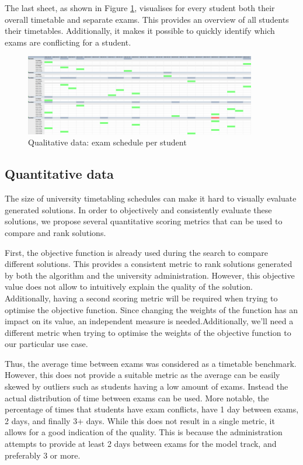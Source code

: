 The last sheet, as shown in Figure \ref{fig:sheet3}, visualises for every student both their overall timetable and separate exams. This provides an overview of all students their timetables. Additionally, it makes it possible to quickly identify which exams are conflicting for a student.

\begin{figure}[H]
	\centering
	\includegraphics[width=0.9\textwidth]{images/excel/excel_sheet3.png} 
	\caption{Qualitative data: exam schedule per student}
	\label{fig:sheet3}
\end{figure}

\subsection{Quantitative data} \label{quantitative}

The size of university timetabling schedules can make it hard to visually evaluate generated solutions. In order to objectively and consistently evaluate these solutions, we propose several quantitative scoring metrics that can be used to compare and rank solutions.

First, the objective function is already used during the search to compare different solutions. This provides a  consistent metric to rank  solutions generated by both the algorithm and the university administration. However, this objective value does not allow to intuitively explain the quality of the solution. Additionally, having a second scoring metric will be required when trying to optimise the objective function. Since changing the weights of the function has an impact on its value, an independent measure is needed.Additionally, we'll need a different metric when trying to optimise the weights of the objective function to our particular use case. 

Thus, the average time between exams was considered as a timetable benchmark. However, this does not provide a suitable metric as the average can be easily skewed by outliers such as students having a low amount of exams. Instead the actual distribution of time between exams can be used. More notable, the percentage of times that students have exam conflicts, have 1 day between exams, 2 days, and finally 3+ days. While this does not result in a single metric, it allows for a good indication of the quality. This is because the administration attempts to provide at least 2 days between exams for the model track, and preferably 3 or more.

